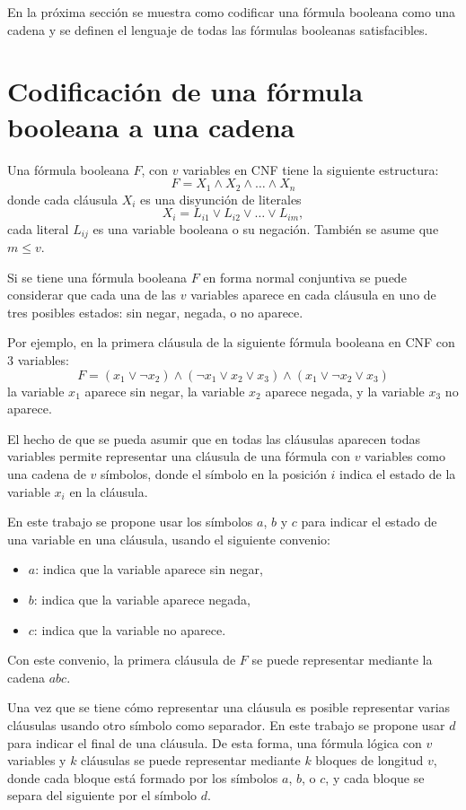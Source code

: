 \documentclass{article}
\begin{document}
En la próxima sección se muestra como codificar una fórmula booleana como una cadena y se definen el lenguaje de todas las fórmulas booleanas satisfacibles.

\section{Codificación de una fórmula booleana a una cadena}
\label{sec:codsat}

Una fórmula booleana $F$, con $v$ variables en CNF tiene la siguiente estructura:
$$F=X_1 \wedge X_2 \wedge \ldots \wedge X_n$$
donde cada cláusula $X_i$ es una disyunción de literales
$$X_i=L_{i1} \vee L_{i2} \vee \ldots \vee L_{im},$$
cada literal $L_{ij}$ es una variable booleana o su negación. También se asume que $m\leq v$.

Si se tiene una fórmula booleana $F$ en forma normal conjuntiva se puede considerar que cada una de las $v$ variables aparece en cada cláusula en uno de tres posibles estados: sin negar, negada, o no aparece.

Por ejemplo, en la primera cláusula de la siguiente fórmula booleana en CNF con 3 variables:
$$F=(x_1 \vee \neg x_2) \wedge (\neg x_1 \vee x_2 \vee x_3) \wedge (x_1 \vee \neg x_2 \vee x_3)$$
la variable $x_1$ aparece sin negar, la variable $x_2$ aparece negada, y la variable $x_{3}$ no aparece.

El hecho de que se pueda asumir que en todas las cláusulas aparecen todas variables permite representar una cláusula de una fórmula con $v$ variables como una cadena de $v$ símbolos, donde el símbolo en la posición $i$ indica el estado de la variable $x_i$ en la cláusula.

En este trabajo se propone usar los símbolos $a$, $b$ y $c$ para indicar el estado de una variable en una cláusula, usando el siguiente convenio:

\begin{itemize}
    \item $a$: indica que la variable aparece sin negar,
    \item $b$: indica que la variable aparece negada,
    \item $c$: indica que la variable no aparece.
\end{itemize}

Con este convenio, la primera cláusula de $F$ se puede representar mediante la cadena $abc$.

Una vez que se tiene cómo representar una cláusula es posible representar varias cláusulas usando otro símbolo como separador.
En este trabajo se propone usar $d$ para indicar el final de una cláusula. De esta forma, una fórmula lógica con $v$ variables y $k$ cláusulas se puede representar mediante $k$ bloques de longitud $v$, donde cada bloque está formado por los símbolos $a$, $b$, o $c$, y cada bloque se separa del siguiente por el símbolo $d$.
\end{document}
